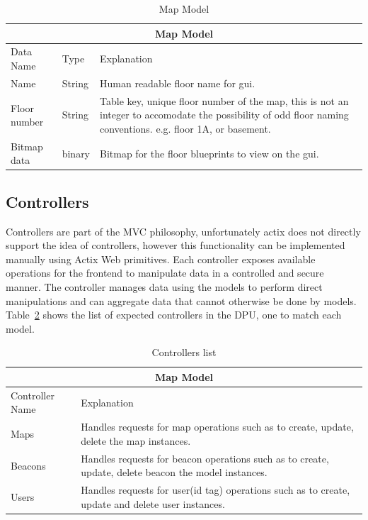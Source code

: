 \begin{table}[H]
\centering
\begin{tabular}{| m{3cm} | m{3cm} | m{9.5cm} |}
	\hline
	\multicolumn{3}{|c|}{Map Model} \\
	\hline
	Data Name & Type & Explanation \\
	\hline
	Name & String & Human readable floor name for gui. \\
	\hline
	Floor number & String & Table key, unique floor number of the map, this is not an integer to accomodate the possibility of odd floor naming conventions. e.g. floor 1A, or basement. \\
	\hline
	Bitmap data & binary & Bitmap for the floor blueprints to view on the gui. \\
	\hline
\end{tabular}
\caption{Map Model}
\label{map_model}
\end{table}


\subsection{Controllers}
Controllers are part of the MVC philosophy, unfortunately actix does not directly support the idea of controllers, however this functionality can be implemented manually using Actix Web primitives.
Each controller exposes available operations for the frontend to manipulate data in a controlled and secure manner.
The controller manages data using the models to perform direct manipulations and can aggregate data that cannot otherwise be done by models.
Table~\ref{controllers_table} shows the list of expected controllers in the DPU, one to match each model.

\begin{table}[H]
\centering
\begin{tabular}{| m{3cm} | m{9.5cm} |}
	\hline
	\multicolumn{2}{|c|}{Map Model} \\
	\hline
	Controller Name & Explanation \\
	\hline
	Maps & Handles requests for map operations such as to create, update, delete the map instances. \\
	\hline
	Beacons & Handles requests for beacon operations such as to create, update, delete beacon the model instances. \\
	\hline
	Users & Handles requests for user(id tag) operations such as to create, update and delete user instances. \\
	\hline
\end{tabular}
\caption{Controllers list}
\label{controllers_table}
\end{table}

